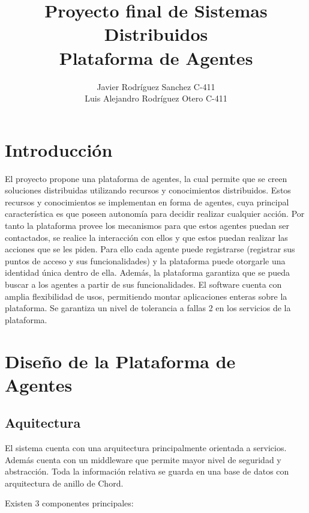 \documentclass[11pt]{article}
\author{
    Javier Rodríguez Sanchez C-411 \\ 
    Luis Alejandro Rodríguez Otero C-411
    }
\title{Proyecto final de Sistemas Distribuidos \\ Plataforma de Agentes}
\begin{document}
 
    \maketitle
    \newpage

    \tableofcontents
    \newpage

    \section{Introducción}

    El proyecto propone una plataforma de agentes, la cual permite que se creen soluciones distribuidas 
    utilizando recursos y conocimientos distribuidos. Estos recursos y conocimientos se implementan en 
    forma de agentes, cuya principal característica es que poseen autonomía para decidir realizar cualquier 
    acción. Por tanto la plataforma provee los mecanismos para que estos agentes puedan ser contactados, 
    se realice la interacción con ellos y que estos puedan realizar las acciones que se les piden. Para 
    ello cada agente puede registrarse (registrar sus puntos de acceso y sus funcionalidades) y la plataforma 
    puede otorgarle una identidad única dentro de ella. Además, la plataforma garantiza que se pueda buscar 
    a los agentes a partir de sus funcionalidades. El software cuenta con amplia flexibilidad de usos, 
    permitiendo montar aplicaciones enteras sobre la plataforma. Se garantiza un nivel de tolerancia a 
    fallas 2 en los servicios de la plataforma.

    \newpage

    \section{Diseño de la Plataforma de Agentes}

    \subsection{Aquitectura}

    El sistema cuenta con una arquitectura principalmente orientada a servicios. Además cuenta con un 
    middleware que permite mayor nivel de seguridad y abstracción. Toda la información relativa se guarda 
    en una base de datos con arquitectura de anillo de Chord.

    Existen 3 componentes principales:
\end{document}
